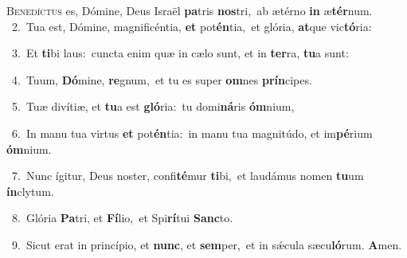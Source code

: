 \lettrine{\initial\textcolor{\initialcolor}{B}}{enedíctus} es, Dómine, Deus Israël \textbf{pa}\-tris \textbf{nos}\-tri,~\star ab ætérno \textbf{in} æ\-\textbf{tér}\-num.\\
{\numbfont\textcolor{\numbcolor}{~2.}}~Tua est, Dómine, magnificéntia, \textbf{et} pot\-\textbf{én}\-tia,~\star et glória, \textbf{at}\-que vic\-\textbf{tó}\-ria:\par
{\numbfont\textcolor{\numbcolor}{~3.}}~Et \textbf{ti}\-bi laus:~\star cuncta enim quæ in cælo sunt, et in \textbf{ter}\-ra, \textbf{tu}\-a sunt:\par
{\numbfont\textcolor{\numbcolor}{~4.}}~Tuum, \textbf{Dó}\-mine, \textbf{re}\-gnum,~\star et tu es super \textbf{om}\-nes \textbf{prín}\-cipes.\par
{\numbfont\textcolor{\numbcolor}{~5.}}~Tuæ divítiæ, et \textbf{tu}\-a est \textbf{gló}\-ria:~\star tu domi\-\textbf{ná}\-ris \textbf{óm}\-nium,\par
{\numbfont\textcolor{\numbcolor}{~6.}}~In manu tua virtus \textbf{et} pot\-\textbf{én}\-tia:~\star in manu tua magnitúdo, et im\-\textbf{pé}\-rium \textbf{óm}\-nium.\par
{\numbfont\textcolor{\numbcolor}{~7.}}~Nunc ígitur, Deus noster, confi\-\textbf{té}\-mur \textbf{ti}\-bi,~\star et laudámus nomen \textbf{tu}\-um \textbf{ín}\-clytum.\par
{\numbfont\textcolor{\numbcolor}{~8.}}~Glória \textbf{Pa}\-tri, et \textbf{Fí}\-lio,~\star et Spi\-\textbf{rí}\-tui \textbf{Sanc}\-to.\par
{\numbfont\textcolor{\numbcolor}{~9.}}~Sicut erat in princípio, et \textbf{nunc}\-, et \textbf{sem}\-per,~\star et in sǽcula sæcu\-\textbf{ló}\-rum. \textbf{A}\-men.\par
